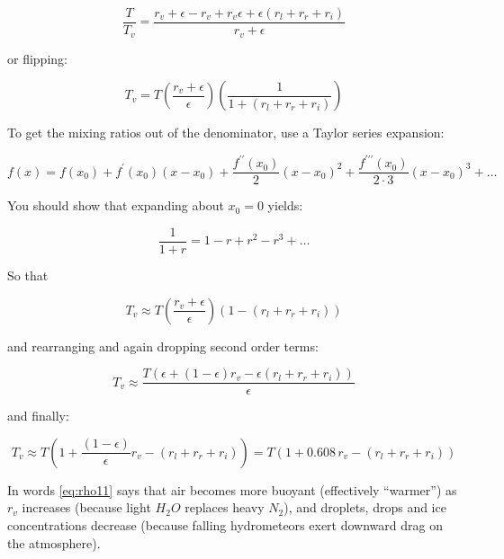 \documentclass[12pt]{article}
\begin{document}
\begin{equation}
  \label{eq:rho7}
 \frac{T}{T_v} = \frac{r_v + \epsilon - r_v + r_v \epsilon + \epsilon (r_l + r_r + r_i) }{r_v + \epsilon}
\end{equation}

or flipping:

\begin{equation}
  \label{eq:rho8}
 T_v =  T \left ( \frac{r_v + \epsilon}{\epsilon} \right ) \left ( \frac{ 1  }{1 + (r_l + r_r + r_i)}
 \right )
\end{equation}

To get the mixing ratios out of the denominator, use a Taylor series expansion:

\begin{equation}
  \label{eq:taylor}
  f(x)  = f(x_0) + f^\prime(x_0)(x - x_0) + \frac{f^{\prime\prime}(x_0)}{2}(x-x_0)^2 +
            \frac{f^{\prime\prime\prime}(x_0)}{2\cdot3}(x-x_0)^3 + \ldots
\end{equation}

You should show that expanding about $x_0 = 0$ yields:

\begin{equation}
  \label{eq:expan}
\frac{1}{1 + r} = 1 - r + r^2 - r^3 + \ldots  
\end{equation}

So that


\begin{equation}
  \label{eq:rho9}
 T_v \approx  T \left ( \frac{r_v + \epsilon}{\epsilon} \right ) \left ( 1 - (r_l + r_r + r_i)
 \right )
\end{equation}

and rearranging and again dropping second order terms:

\begin{equation}
  \label{eq:rho10}
 T_v \approx   \frac{T (\epsilon + (1-\epsilon) r_v - \epsilon(r_l + r_r + r_i))}{\epsilon}
\end{equation}

and finally:

\begin{equation}
  \label{eq:rho11}
 T_v \approx   T \left ( 1 + \frac{( 1-\epsilon)}{\epsilon} r_v - (r_l + r_r + r_i) \right )
 = T \left ( 1 + 0.608\, r_v - (r_l + r_r + r_i) \right )
\end{equation}

In words \eqref{eq:rho11} says that air becomes more buoyant (effectively ``warmer'')
as $r_v$ increases (because light $H_2O$ replaces heavy $N_2$), and droplets,
drops and ice concentrations decrease (because falling hydrometeors exert downward
drag on the
atmosphere).
\end{document}
